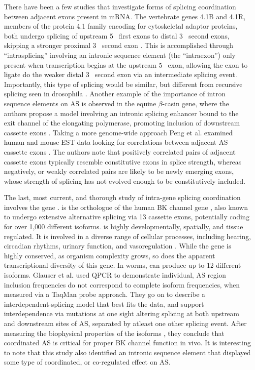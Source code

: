     There have been a few studies that investigate forms of splicing coordination between adjacent exons present in mRNA. The vertebrate genes 4.1B and 4.1R, members of the protein 4.1 family encoding for cytoskeletal adaptor proteins, both undergo splicing of upstream 5\textprime~ first exons to distal 3\textprime~ second exons, skipping a stronger proximal 3\textprime~ second exon \citep{Parra2008, Parra2012}. This is accomplished through ``intrasplicing'' involving an intronic sequence element (the ``intraexon'') only present when transcription begins at the upstream 5\textprime~ exon, allowing the exon to ligate do the weaker distal 3\textprime~ second exon via an intermediate splicing event. Importantly, this type of splicing would be similar, but different from recursive splicing seen in drosophila \citep{Burnette2005a}. Another example of the importance of intron sequence elements on AS is observed in the equine $\beta$-casin gene, where the authors propose a model involving an intronic splicing enhancer bound to the exit channel of the elongating polymerase, promoting inclusion of downstream cassette exons \citep{Lenasi2006}. Taking a more genome-wide approach Peng et al. examined human and mouse EST data looking for correlations between adjacent AS cassette exons \citep{Peng2008}. The authors note that positively correlated pairs of adjacent cassette exons typically resemble constitutive exons in splice strength, whereas negatively, or weakly correlated pairs are likely to be newly emerging exons, whose strength of splicing has not evolved enough to be constitutively included. 

    The last, most current, and thorough study of intra-gene splicing coordination involves the \worms{} gene \slo{} \citep{Glauser2011, Johnson2011}. \slo{} is the \worms{} orthologue of the human BK channel gene \kcnma{}, also known to undergo extensive alternative splicing \citep{Nilsen2010} via 13 cassette exons, potentially coding for over 1,000 different isoforms. \kcnma{} is highly developmentally, spatially, and tissue regulated. It is involved in a diverse range of cellular processes, including hearing, circadian rhythms, urinary function, and vasoregulation \citep{Fodor2009a}. While the gene is highly conserved, as organism complexity grows, so does the apparent transcriptional diversity of this gene. In worms, \slo{} can produce up to 12 different isoforms. Glauser et al. used QPCR to demonstrate individual, AS region inclusion frequencies do not correspond to complete isoform frequencies, when measured via a TaqMan probe approach. They go on to describe a interdependent-splicing model that best fits the data, and support interdependence via mutations at one sight altering splicing at both upstream and downstream sites of AS, separated by atleast one other splicing event. After measuring the biophysical properties of the isoforms \citep{Johnson2011}, they conclude that coordinated AS is critical for proper BK channel function in vivo. It is interesting to note that this study also identified an intronic sequence element that displayed some type of coordinated, or co-regulated effect on AS. 


